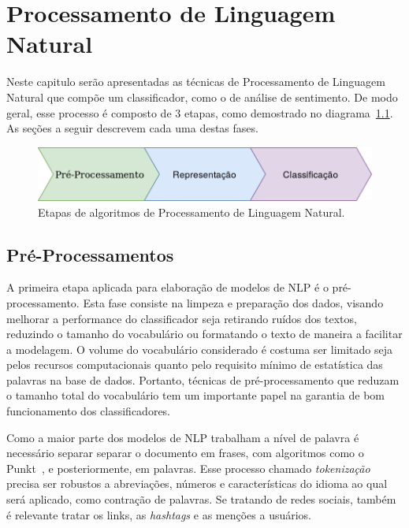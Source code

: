 \chapter{Processamento de Linguagem Natural}
\label{chapter:nlp}

Neste capitulo serão apresentadas as técnicas de Processamento de Linguagem
Natural que compõe um classificador, como o de análise de sentimento.
De modo geral, esse processo é composto de 3 etapas, como demostrado no
diagrama~\ref{fig:nlp_diagram}.
As seções a seguir descrevem cada uma destas fases.

\begin{figure}[h]
\begin{center} {
    \begin{center}
    \includegraphics[scale=0.35]{images/nlp_diagram.png}
    \caption{Etapas de algoritmos de Processamento de Linguagem Natural.}
    \label{fig:nlp_diagram}
    \end{center}
}
\end{center}
\end{figure}

\section{Pré-Processamentos}

A primeira etapa aplicada para elaboração de modelos de NLP é o
pré-processamento.
Esta fase consiste na limpeza e preparação dos dados, visando melhorar a
performance do classificador seja retirando ruídos dos textos, reduzindo o
tamanho do vocabulário ou formatando o texto de maneira a facilitar a modelagem.
O volume do vocabulário considerado é costuma ser limitado seja pelos recursos
computacionais quanto pelo requisito mínimo de estatística das palavras na base
de dados.
Portanto, técnicas de pré-processamento que reduzam o tamanho total do
vocabulário tem um importante papel na garantia de bom funcionamento dos
classificadores.

Como a maior parte dos modelos de NLP trabalham a nível de palavra é necessário
separar separar o documento em frases, com algoritmos como o Punkt~\cite{kiss06},
e posteriormente, em palavras.
Esse processo chamado \textit{tokenização} precisa ser robustos a abreviações,
números e características do idioma ao qual será aplicado, como contração de
palavras.
Se tratando de redes sociais, também é relevante tratar os links, as
\textit{hashtags} e as menções a usuários.

